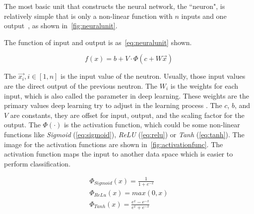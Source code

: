 \begin{spacing}{1.5}
The most basic unit that constructs the neural network, the ``neuron", is relatively simple that is only a non-linear function with $n$ inputs and one output~\cite{bengio2017deep}, as shown in~\autoref{fig:neuralunit}. 

The function of input and output is as~\autoref{eq:neuralunit} shown. 

\begin{equation}
\label{eq:neuralunit}
    f(x)=b+V \cdot \Phi (c+W \vec{x})
\end{equation}

The $\vec{x_i},i \in [1,n]$ is the input value of the neutron. Usually, those input values are the direct output of the previous neutron. The $W_i$ is the weights for each input, which is also called the parameter in deep learning. These weights are the primary values deep learning try to adjust in the learning process . The $c$, $b$, and $V$ are constants, they are offset for input, output, and the scaling factor for the output. The $\Phi (\cdot)$ is the activation function, which could be some non-linear functions like \textit{Sigmoid} (\autoref{eq:sigmoid}), \textit{ReLU} (\autoref{eq:relu}) or \textit{Tanh} (\autoref{eq:tanh}). The image for the activation functions are shown in~\autoref{fig:activationfunc}. The activation function maps the input to another data space which is easier to perform classification. 



\begin{gather}
   \Phi_{Sigmoid}(x)=\frac{1}{1+e^{-x}} \label{eq:sigmoid}\\
   \Phi_{ReLu}(x)=max(0,x) \label{eq:relu}\\
   \Phi_{Tanh}(x)=\frac{e^{x}-e^{-x}}{e^{x}+e^{-x}} \label{eq:tanh}
\end{gather}


\end{spacing}
